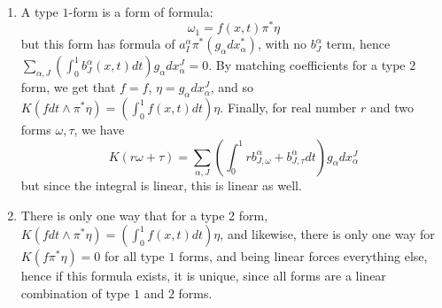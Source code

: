 \documentclass{article}
\begin{document}
\begin{solution}
\

\begin{enumerate}
  \item A type $1$-form is a form of formula: $$\omega_1 = f(x,t)\pi^*\eta$$but this form has formula of $a_I^\alpha \pi^*(g_\alpha dx^*_\alpha)$, with no $b_J^\alpha$ term, hence $\sum_{\alpha, J}(\int_0^1 b_J^\alpha(x,t)dt)g_\alpha dx^J_\alpha = 0$. By matching coefficients for a type $2$ form, we get that $f = f$, $\eta = g_\alpha dx^J_\alpha$, and so $K(f dt \wedge \pi^*\eta) = (\int_0^1 f(x,t) dt)\eta$. Finally, for real number $r$ and two forms $\omega, \tau$, we have $$K(r\omega + \tau) = \sum_{\alpha, J}(\int_0^1 rb_{J, \omega}^\alpha + b_{J, \tau}^\alpha dt)g_\alpha dx^J_\alpha$$but since the integral is linear, this is linear as well.
  \item There is only one way that for a type 2 form, $K(f dt \wedge \pi^* \eta) = (\int_0^1 f(x,t) dt)\eta$, and likewise, there is only one way for $K(f\pi^*\eta) = 0$ for all type $1$ forms, and being linear forces everything else, hence if this formula exists, it is unique, since all forms are a linear combination of type $1$ and $2$ forms.
\end{enumerate}

\end{solution}
\end{document}
